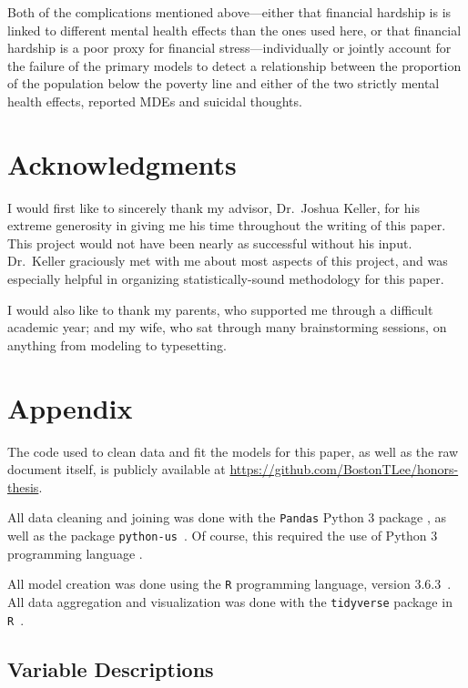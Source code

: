 \documentclass{article}
\begin{document}
Both of the complications mentioned above---either
that financial hardship is is linked to different mental
health effects than the ones used here,
or that financial hardship is a poor proxy for financial
stress---individually or jointly account for the
failure of the primary models to detect a relationship
between the proportion of the population below the poverty line
and either of the two strictly mental health effects,
reported MDEs and suicidal thoughts.

\section{Acknowledgments}

I would first like to sincerely thank my advisor,
Dr.\ Joshua Keller, for his extreme generosity in giving
me his time throughout the writing of this paper.
This project would not have been nearly as successful
without his input.
Dr.\ Keller graciously met with me about most
aspects of this project, and was especially
helpful in organizing statistically-sound
methodology for this paper.

I would also like to thank my parents, who supported
me through a difficult academic year; and my wife,
who sat through many brainstorming sessions,
on anything from modeling to typesetting.

\pagebreak

\section{Appendix}

The code used to clean data and fit the models for this
paper, as well as the raw document itself,
is publicly available at
\url{https://github.com/BostonTLee/honors-thesis}.

All data cleaning and joining was done with the \texttt{Pandas} Python 3 package
\cite{python_pandas}, as well as the package \texttt{python-us}~\cite{python_us}.
Of course, this required the use of Python 3 programming language
\cite{python_lang}.

All model creation was done using the \texttt{R} programming
language, version 3.6.3~\cite{r_lang}.
All data aggregation and visualization was done with the
\texttt{tidyverse} package in \texttt{R}~\cite{r_tidyverse}.

\subsection{Variable Descriptions}\label{sec:variables}
\end{document}
